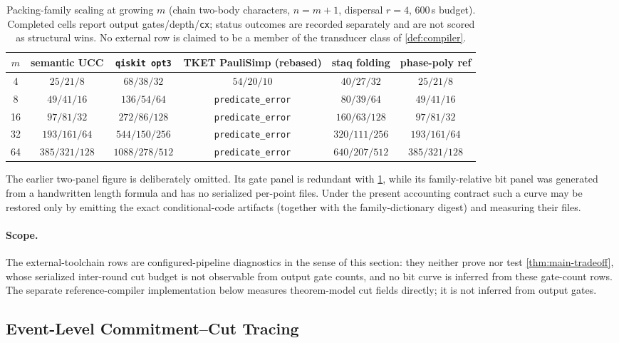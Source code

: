 \documentclass[aps,prx,reprint,floatfix,superscriptaddress]{revtex4-2}
\begin{document}
\begin{table}[!t]
\centering
\small
\begin{tabular}{cccccc}
\toprule
$m$ & semantic UCC & \texttt{qiskit opt3} & TKET PauliSimp (rebased) & staq folding & phase-poly ref \\
\midrule
4  & $25/21/8$ & $68/38/32$ & $54/20/10$ & $40/27/32$ & $25/21/8$ \\
8  & $49/41/16$ & $136/54/64$ & \texttt{predicate\_error} & $80/39/64$ & $49/41/16$ \\
16 & $97/81/32$ & $272/86/128$ & \texttt{predicate\_error} & $160/63/128$ & $97/81/32$ \\
32 & $193/161/64$ & $544/150/256$ & \texttt{predicate\_error} & $320/111/256$ & $193/161/64$ \\
64 & $385/321/128$ & $1088/278/512$ & \texttt{predicate\_error} & $640/207/512$ & $385/321/128$ \\
\bottomrule
\end{tabular}
\caption{Packing-family scaling at growing $m$ (chain two-body
characters, $n = m+1$, dispersal $r = 4$, 600\,s budget). Completed cells
report output gates/depth/\texttt{cx}; status outcomes are recorded separately and are not
scored as structural wins. No external row is claimed to be a member of
the transducer class of \cref{def:compiler}.}
\label{tab:packing-scaling}
\end{table}

The earlier two-panel figure is deliberately omitted.  Its gate panel is
redundant with \cref{tab:packing-scaling}, while its family-relative bit panel
was generated from a handwritten length formula and has no serialized
per-point files.  Under the present accounting contract such a curve may be
restored only by emitting the exact conditional-code artifacts (together with
the family-dictionary digest) and measuring their files.

\paragraph{Scope.}
The external-toolchain rows are configured-pipeline diagnostics in the
sense of this section: they neither prove nor test
\cref{thm:main-tradeoff}, whose serialized inter-round cut budget is not
observable from output gate counts, and no bit curve is inferred from these
gate-count rows.  The separate reference-compiler implementation below
measures theorem-model cut fields directly; it is not inferred from output
gates.

\subsection{Event-Level Commitment--Cut Tracing}
\label{sec:cut-tracing}
\end{document}
